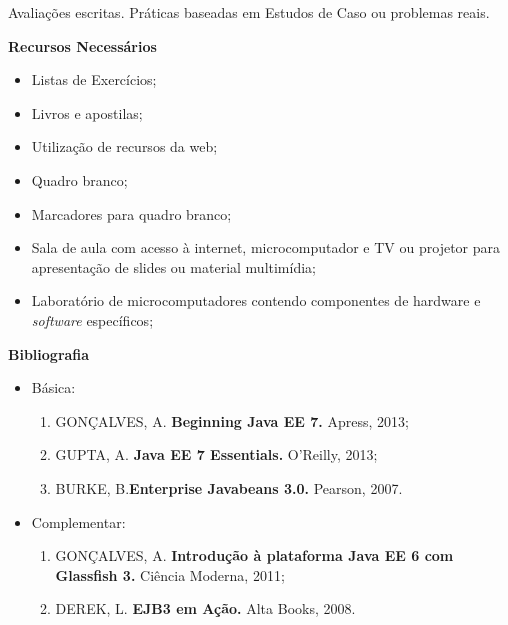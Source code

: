 \noindent
  Avaliações escritas. Práticas baseadas em Estudos de Caso ou problemas reais.

\begin{snugshade}\begin{center}\textbf{
    Recursos Necessários
    \vphantom{q} %
}\end{center}\end{snugshade}

\begin{itemize} 
  \item Listas de Exercícios;
  \item Livros e apostilas;
  \item Utilização de recursos da web;
  \item Quadro branco;
  \item Marcadores para quadro branco;
  \item Sala de aula com acesso à internet, microcomputador e TV ou projetor para apresentação de slides ou material multimídia;
  \item Laboratório de microcomputadores contendo componentes de hardware e \textit{software} específicos;
\end{itemize}


\begin{snugshade}\begin{center}\textbf{
    Bibliografia
}\end{center}\end{snugshade}

\begin{itemize} 
  \item Básica:
	\begin{enumerate}
	\item 	GONÇALVES, A. \textbf{Beginning Java EE 7.} Apress, 2013;
	\item 	GUPTA, A. \textbf{Java EE 7 Essentials.} O’Reilly, 2013;
	\item 	BURKE, B.\textbf{Enterprise Javabeans 3.0.} Pearson, 2007. 
	\end{enumerate}
  \item Complementar:
	\begin{enumerate} 
	\item 	GONÇALVES, A. \textbf{Introdução à plataforma Java EE 6 com Glassfish 3.} Ciência Moderna, 2011;
	\item 	DEREK, L. \textbf{EJB3 em Ação.} Alta Books, 2008.
	\end{enumerate}
\end{itemize}
